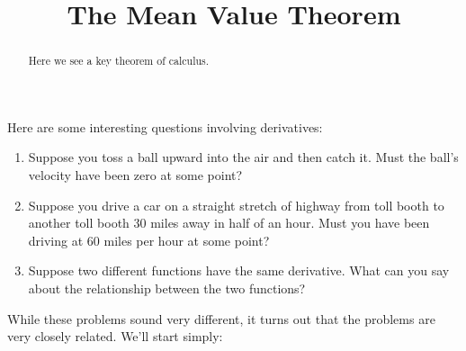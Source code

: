\documentclass{ximera}
\title[Dig-In:]{The Mean Value Theorem}
\begin{document}
\begin{abstract}
  Here we see a key theorem of calculus.
\end{abstract}
\maketitle


Here are some interesting questions involving derivatives:

\begin{enumerate}
\item Suppose you toss a ball upward into the air and then catch it. Must the
  ball's  velocity have been zero at some point?
\item Suppose you drive a car on a straight stretch of highway from toll booth to
  another toll booth $30$ miles away in half of an hour. Must you have
  been driving at $60$ miles per hour at some point?
\item Suppose two different functions have the same derivative. What
  can you say about the relationship between the two functions?
\end{enumerate}

While these problems sound very different, it turns out that the
problems are very closely related. We'll start simply:
\end{document}
